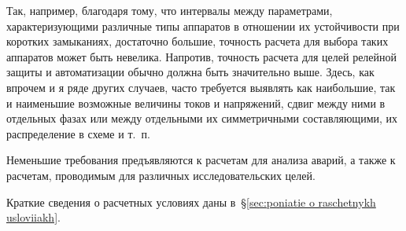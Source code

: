 Так, например, благодаря тому, что интервалы между параметрами, характеризующими различные типы аппаратов в отношении их устойчивости при коротких замыканиях, достаточно большие, точность расчета для выбора таких аппаратов может быть невелика. Напротив, точность расчета для целей релейной защиты и автоматизации обычно должна быть значительно выше. Здесь, как впрочем и я ряде других случаев, часто требуется выявлять как наибольшие, так и наименьшие возможные величины токов и напряжений, сдвиг между ними в отдельных фазах или между отдельными их симметричными составляющими, их распределение в схеме и т.~п.

Неменьшие требования предъявляются к расчетам для анализа аварий, а также к расчетам, проводимым для различных исследовательских целей.

Краткие сведения о расчетных условиях даны в~§\ref{sec:poniatie o raschetnykh usloviiakh}.


















